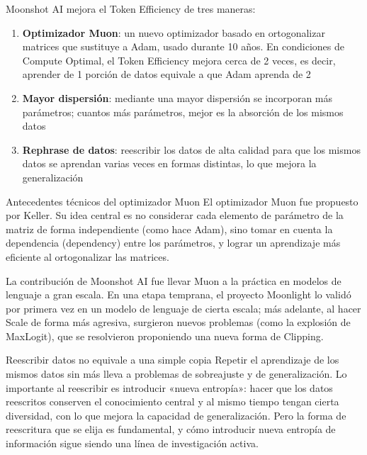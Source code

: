 Moonshot AI mejora el Token Efficiency de tres maneras:

\begin{enumerate}
    \item \textbf{Optimizador Muon}: un nuevo optimizador basado en ortogonalizar matrices que sustituye a Adam, usado durante 10 años. En condiciones de Compute Optimal, el Token Efficiency mejora cerca de 2 veces, es decir, aprender de 1 porción de datos equivale a que Adam aprenda de 2
    \item \textbf{Mayor dispersión}: mediante una mayor dispersión se incorporan más parámetros; cuantos más parámetros, mejor es la absorción de los mismos datos
    \item \textbf{Rephrase de datos}: reescribir los datos de alta calidad para que los mismos datos se aprendan varias veces en formas distintas, lo que mejora la generalización
\end{enumerate}

\begin{knowledgebox}{Antecedentes técnicos del optimizador Muon}
El optimizador Muon fue propuesto por Keller. Su idea central es no considerar cada elemento de parámetro de la matriz de forma independiente (como hace Adam), sino tomar en cuenta la dependencia (dependency) entre los parámetros, y lograr un aprendizaje más eficiente al ortogonalizar las matrices.

La contribución de Moonshot AI fue llevar Muon a la práctica en modelos de lenguaje a gran escala. En una etapa temprana, el proyecto Moonlight lo validó por primera vez en un modelo de lenguaje de cierta escala; más adelante, al hacer Scale de forma más agresiva, surgieron nuevos problemas (como la explosión de MaxLogit), que se resolvieron proponiendo una nueva forma de Clipping.
\end{knowledgebox}

\begin{warningbox}{Reescribir datos no equivale a una simple copia}
Repetir el aprendizaje de los mismos datos sin más lleva a problemas de sobreajuste y de generalización. Lo importante al reescribir es introducir «nueva entropía»: hacer que los datos reescritos conserven el conocimiento central y al mismo tiempo tengan cierta diversidad, con lo que mejora la capacidad de generalización. Pero la forma de reescritura que se elija es fundamental, y cómo introducir nueva entropía de información sigue siendo una línea de investigación activa.
\end{warningbox}

